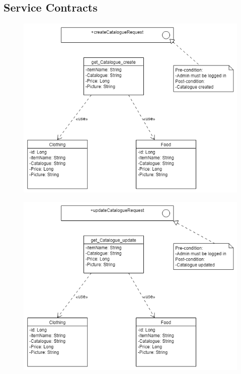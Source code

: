 \documentclass[12pt]{article}
\begin{document}
\subsection{Service Contracts}
\begin{figure}[h]
\centering
\includegraphics[scale=0.4]{diagrams/notC.png}
\end{figure}
\begin{figure}[h]
\centering
\includegraphics[scale=0.4]{diagrams/notSeq.png}
\end{figure}
\end{document}
